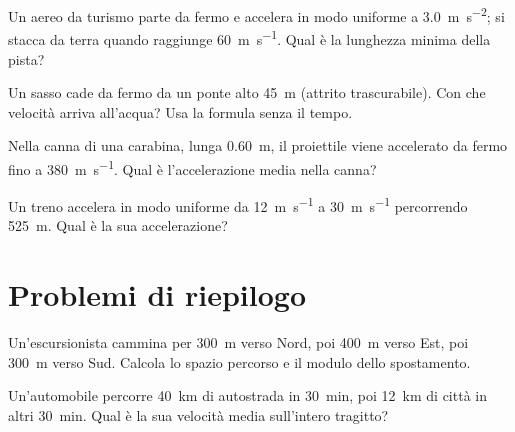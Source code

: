 \begin{esercizio}
Un aereo da turismo parte da fermo e accelera in modo uniforme a \SI{3,0}{\metre\per\second\squared}; si stacca da terra quando raggiunge \SI{60}{\metre\per\second}. Qual è la lunghezza minima della pista?\\
\end{esercizio}

\begin{esercizio}
Un sasso cade da fermo da un ponte alto \SI{45}{\metre} (attrito trascurabile). Con che velocità arriva all'acqua? Usa la formula senza il tempo.\\
\end{esercizio}

\begin{esercizio}
Nella canna di una carabina, lunga \SI{0,60}{\metre}, il proiettile viene accelerato da fermo fino a \SI{380}{\metre\per\second}. Qual è l'accelerazione media nella canna?\\
\end{esercizio}

\begin{esercizio}
Un treno accelera in modo uniforme da \SI{12}{\metre\per\second} a \SI{30}{\metre\per\second} percorrendo \SI{525}{\metre}. Qual è la sua accelerazione?\\
\end{esercizio}

\section{Problemi di riepilogo}

\begin{esercizio}
Un'escursionista cammina per \SI{300}{\metre} verso Nord, poi \SI{400}{\metre} verso Est, poi \SI{300}{\metre} verso Sud. Calcola lo spazio percorso e il modulo dello spostamento.\\
\end{esercizio}

\begin{esercizio}
Un'automobile percorre \SI{40}{\kilo\metre} di autostrada in \SI{30}{\minute}, poi \SI{12}{\kilo\metre} di città in altri \SI{30}{\minute}. Qual è la sua velocità media sull'intero tragitto?\\
\end{esercizio}

